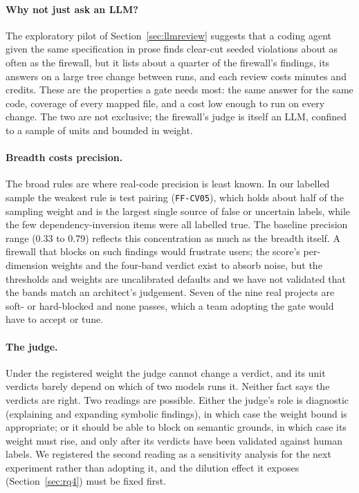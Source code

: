 \documentclass[10pt,a4paper]{article}
\newcommand{\ff}[1]{\texttt{\small #1}}
\begin{document}
\paragraph{Why not just ask an LLM?}
The exploratory pilot of Section~\ref{sec:llmreview} suggests that a coding agent given the same specification in
prose finds clear-cut seeded violations about as often as the firewall, but it lists about a quarter of the
firewall's findings, its answers on a large tree change between runs, and each review costs minutes and credits.
These are the properties a gate needs most: the same answer for the same code, coverage of every mapped file, and a
cost low enough to run on every change. The two are not exclusive; the firewall's judge is itself an LLM, confined
to a sample of units and bounded in weight.

\paragraph{Breadth costs precision.}
The broad rules are where real-code precision is least known. In our labelled sample the weakest rule is test
pairing (\ff{FF-CV05}), which holds about half of the sampling weight and is the largest single source of false or
uncertain labels, while the few dependency-inversion items were all labelled true. The baseline precision range
(0.33 to 0.79) reflects this concentration as much as the breadth itself. A firewall that blocks on such findings
would frustrate users; the score's per-dimension weights and the four-band verdict exist to absorb noise, but the
thresholds and weights are uncalibrated defaults and we have not validated that the bands match an architect's
judgement. Seven of the nine real projects are soft- or hard-blocked and none passes, which a team adopting the
gate would have to accept or tune. %

\paragraph{The judge.}
Under the registered weight the judge cannot change a verdict, and its unit verdicts barely depend on which of two
models runs it. Neither fact says the verdicts are right. Two readings are possible. Either the judge's role is
diagnostic (explaining and expanding symbolic findings), in which case the weight bound is appropriate; or it should
be able to block on semantic grounds, in which case its weight must rise, and only after its verdicts have been
validated against human labels. We registered the second reading as a sensitivity analysis for the next experiment
rather than adopting it, and the dilution effect it exposes (Section~\ref{sec:rq4}) must be fixed first.
\end{document}
